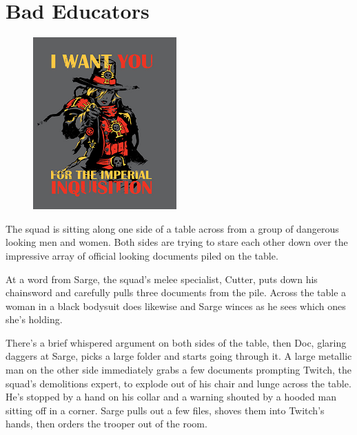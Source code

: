 \chapter{Bad Educators}

\begin{figure}
	\begin{center}
		\includegraphics[width=\figwidth]{pics/8/1.png}
	\end{center}
\end{figure}
The squad is sitting along one side of a table across from a group of dangerous looking men and women. 
Both sides are trying to stare each other down over the impressive array of official looking documents piled on the table.

At a word from Sarge, the squad’s melee specialist, Cutter, puts down his chainsword and carefully pulls three documents from the pile. 
Across the table a woman in a black bodysuit does likewise and Sarge winces as he sees which ones she’s holding.

There’s a brief whispered argument on both sides of the table, then Doc, glaring daggers at Sarge, picks a large folder and starts going through it. 
A large metallic man on the other side immediately grabs a few documents prompting Twitch, the squad’s demolitions expert, to explode out of his chair and lunge across the table. 
He’s stopped by a hand on his collar and a warning shouted by a hooded man sitting off in a corner. 
Sarge pulls out a few files, shoves them into Twitch’s hands, then orders the trooper out of the room.

